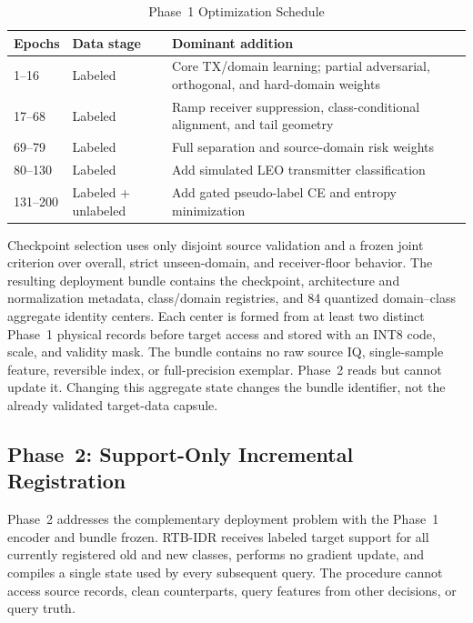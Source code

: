 \documentclass[journal]{IEEEtran}
\newcommand{\stagehead}{RTB-IDR}
\begin{document}
\begin{table}[t]
\caption{Phase~1 Optimization Schedule}
\label{tab:p1_schedule}
\centering
\footnotesize
\begin{tabular}{p{}p{}p{}}
\toprule
Epochs & Data stage & Dominant addition \\
\midrule
1--16 & Labeled & Core TX/domain learning; partial adversarial, orthogonal, and hard-domain weights \\
17--68 & Labeled & Ramp receiver suppression, class-conditional alignment, and tail geometry \\
69--79 & Labeled & Full separation and source-domain risk weights \\
80--130 & Labeled & Add simulated LEO transmitter classification \\
131--200 & Labeled + unlabeled & Add gated pseudo-label CE and entropy minimization \\
\bottomrule
\end{tabular}
\end{table}

Checkpoint selection uses only disjoint source validation and a frozen joint criterion over overall, strict unseen-domain, and receiver-floor behavior. The resulting deployment bundle contains the checkpoint, architecture and normalization metadata, class/domain registries, and 84 quantized domain--class aggregate identity centers. Each center is formed from at least two distinct Phase~1 physical records before target access and stored with an INT8 code, scale, and validity mask. The bundle contains no raw source IQ, single-sample feature, reversible index, or full-precision exemplar. Phase~2 reads but cannot update it. Changing this aggregate state changes the bundle identifier, not the already validated target-data capsule.

\subsection{Phase~2: Support-Only Incremental Registration}

Phase~2 addresses the complementary deployment problem with the Phase~1 encoder and bundle frozen. \stagehead{} receives labeled target support for all currently registered old and new classes, performs no gradient update, and compiles a single state used by every subsequent query. The procedure cannot access source records, clean counterparts, query features from other decisions, or query truth.
\end{document}
